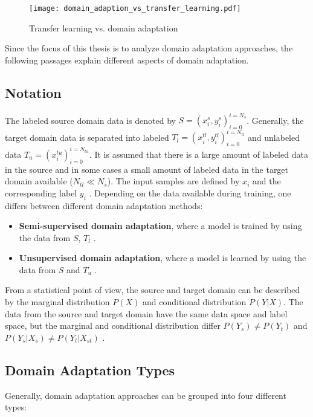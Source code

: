 \begin{figure}[H]
  \centering
  \texttt{[image: domain\_adaption\_vs\_transfer\_learning.pdf]}
  \caption {Transfer learning vs. domain adaptation} \label{fig:domain_adaption_vs_transfer_learning}
\end{figure}

Since the focus of this thesis is to analyze domain adaptation approaches, the following passages explain different aspects of domain adaptation.
\subsection{Notation}
The labeled source domain data is denoted by  $S = {(x_{i}^{s}, y_{i}^{s})_{i = 0}^{i = N_{s}}}$. Generally, the target domain data is separated into labeled $T_{l} = {(x_{i}^{tl}, y_{i}^{tl})_{i = 0}^{i = N_{tl}}}$ and unlabeled data $T_{u} = {(x_{i}^{tu})_{i = 0}^{i = N_{tu}}}$. It is assumed that there is a large amount of labeled data in the source and in some cases a small amount of labeled data in the target domain available ($N_{tl} \ll N_{s}$). The input samples are defined by $x_{i}$ and the corresponding label $y_{i}$ \cite{Patel2015}. Depending on the data available during training, one differs between different domain adaptation methods: 
\begin{itemize}
\item \textbf{Semi-supervised domain adaptation}, where a model is trained by using the data from $S$, $T_{l}$ \cite{Patel2015}. 
\item \textbf{Unsupervised domain adaptation}, where a model is learned by using the data from $S$ and $T_{u}$ \cite{Patel2015}.
\end{itemize}

From a statistical point of view, the source and target domain can be described by the marginal distribution $P(X)$ and conditional distribution $P(Y|X)$. The data from the source and target domain have the same data space and label space, but the marginal and conditional distribution differ $P(Y_{s}) \neq P(Y_{t})$ and $P(Y_{s}|X_{s}) \neq P(Y_{t}|X_{st})$ \cite{Qikang2020}.

\subsection{Domain Adaptation Types}
Generally, domain adaptation approaches can be grouped into four different types: 

